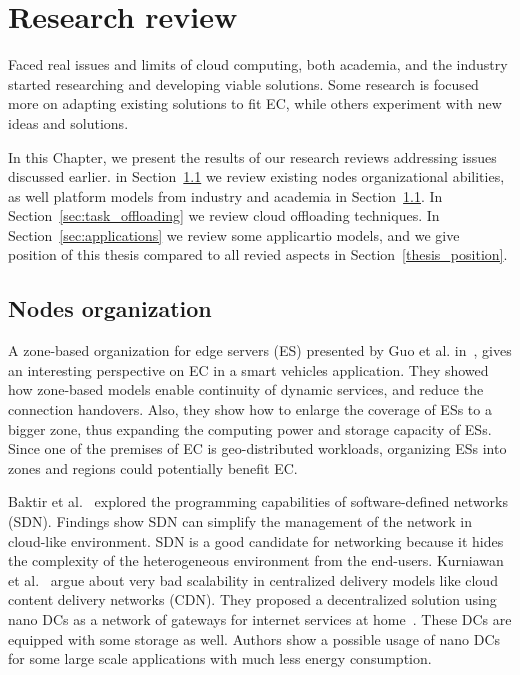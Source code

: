 \chapter{Research review}\label{chapter:Review}
%
Faced real issues and limits of cloud computing, both academia, and the industry started researching and developing viable solutions. Some research is focused more on adapting existing solutions to fit EC, while others experiment with new ideas and solutions. 

In this Chapter, we present the results of our research reviews addressing issues discussed earlier. in Section~\ref{sec:nodes_organization} we review existing nodes organizational abilities, as well platform models from industry and academia in Section~\ref{sec:nodes_organization}. In Section~\ref{sec:task_offloading} we review cloud offloading techniques. In Section~\ref{sec:applications} we review some applicartio models, and we give position of this thesis compared to all revied aspects in Section~\ref{thesis_position}.
%
%
\section{Nodes organization}\label{sec:nodes_organization}
A zone-based organization for edge servers (ES) presented by Guo et al. in~\cite{GuoRG20}, gives an interesting perspective on EC in a smart vehicles application. They showed how zone-based models enable continuity of dynamic services, and reduce the connection handovers. Also, they show how to enlarge the coverage of ESs to a bigger zone, thus expanding the computing power and storage capacity of ESs. Since one of the premises of EC is geo-distributed workloads, organizing ESs into zones and regions could potentially benefit EC. 

Baktir et al.~\cite{BaktirOE17} explored the programming capabilities of software-defined networks (SDN). Findings show SDN can simplify the management of the network in cloud-like environment. SDN is a good candidate for networking because it hides the complexity of the heterogeneous environment from the end-users.
Kurniawan et al.~\cite{inbookKurniawan} argue about very bad scalability in centralized delivery models like cloud content delivery networks (CDN). They proposed a decentralized solution using nano DCs as a network of gateways for internet services at home~\cite{inbookKurniawan}. These DCs are equipped with some storage as well. Authors show a possible usage of nano DCs for some large scale applications with much less energy consumption. 

